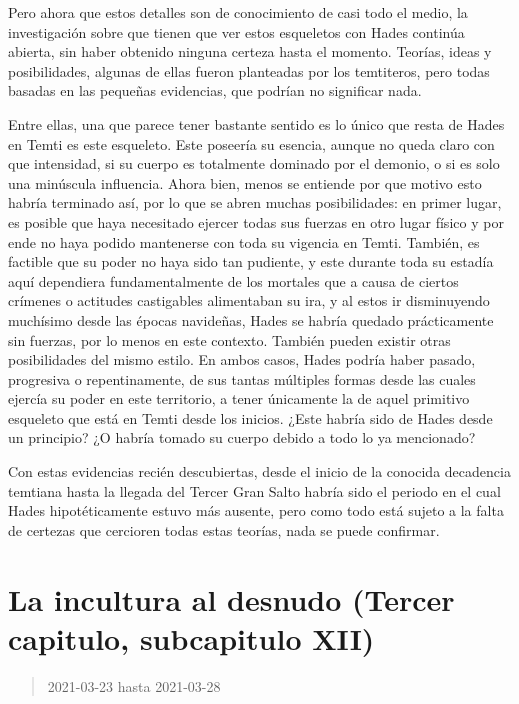 \documentclass[
  spanish,
]{book}
\begin{document}
Pero ahora que estos detalles son de conocimiento de casi todo el medio, la investigación sobre que tienen que ver estos esqueletos con Hades continúa abierta, sin haber obtenido ninguna certeza hasta el momento. Teorías, ideas y posibilidades, algunas de ellas fueron planteadas por los temtiteros, pero todas basadas en las pequeñas evidencias, que podrían no significar nada.

Entre ellas, una que parece tener bastante sentido es lo único que resta de Hades en Temti es este esqueleto. Este poseería su esencia, aunque no queda claro con que intensidad, si su cuerpo es totalmente dominado por el demonio, o si es solo una minúscula influencia. Ahora bien, menos se entiende por que motivo esto habría terminado así, por lo que se abren muchas posibilidades: en primer lugar, es posible que haya necesitado ejercer todas sus fuerzas en otro lugar físico y por ende no haya podido mantenerse con toda su vigencia en Temti. También, es factible que su poder no haya sido tan pudiente, y este durante toda su estadía aquí dependiera fundamentalmente de los mortales que a causa de ciertos crímenes o actitudes castigables alimentaban su ira, y al estos ir disminuyendo muchísimo desde las épocas navideñas, Hades se habría quedado prácticamente sin fuerzas, por lo menos en este contexto. También pueden existir otras posibilidades del mismo estilo.
En ambos casos, Hades podría haber pasado, progresiva o repentinamente, de sus tantas múltiples formas desde las cuales ejercía su poder en este territorio, a tener únicamente la de aquel primitivo esqueleto que está en Temti desde los inicios. ¿Este habría sido de Hades desde un principio? ¿O habría tomado su cuerpo debido a todo lo ya mencionado?

Con estas evidencias recién descubiertas, desde el inicio de la conocida decadencia temtiana hasta la llegada del Tercer Gran Salto habría sido el periodo en el cual Hades hipotéticamente estuvo más ausente, pero como todo está sujeto a la falta de certezas que cercioren todas estas teorías, nada se puede confirmar.

\hypertarget{la-incultura-al-desnudo-tercer-capitulo-subcapitulo-xii}{%
\section{La incultura al desnudo (Tercer capitulo, subcapitulo XII)}\label{la-incultura-al-desnudo-tercer-capitulo-subcapitulo-xii}}

\begin{quote}
2021-03-23 hasta 2021-03-28
\end{quote}
\end{document}
